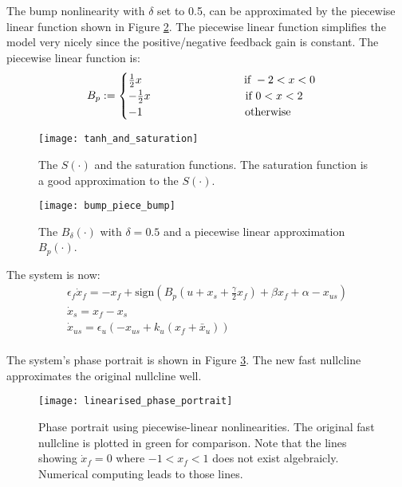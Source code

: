 \documentclass[a4paper, 12pt]{article}
\begin{document}
The bump nonlinearity with $\delta$ set to 0.5, can be approximated by the piecewise linear function shown in Figure \ref{fig:bump_linear}. The piecewise linear function simplifies the model very nicely since the positive/negative feedback gain is constant. The piecewise linear function is:
\begin{equation}
B_p:= \begin{cases}
\frac{1}{2}x \text{ \hspace{3cm}  if } -2<x<0 \\
-\frac{1}{2}x \text{\hspace{3cm}if } 0<x<2 \\
-1 \text{ \hspace{3cm}  otherwise}
\end{cases}
\end{equation}

\begin{figure}[p]
\texttt{[image: tanh\_and\_saturation]}
\caption{The $S(\cdot)$ and the saturation functions. The saturation function is a good approximation to the $S(\cdot)$. }
\label{fig:sigmoid_linear}
\end{figure}

\begin{figure}[p]
\texttt{[image: bump\_piece\_bump]}
\caption{The $B_\delta(\cdot)$ with $\delta = 0.5$ and a piecewise linear approximation $B_p(\cdot)$.}
\label{fig:bump_linear}
\end{figure}
The system is now: 
\begin{equation}
\begin{array}{l}
\displaystyle \epsilon_f\dot{x}_{f} = -x_f + \text{sign}\left(B_p\left(u + x_s + \tfrac{\gamma}{2}x_f\right) + \beta x_f + \alpha  - x_{us}  \right)\\
\displaystyle \dot{x}_{s} = x_f - x_s \\
\displaystyle \dot{x}_{us} = \epsilon_u\left(-x_{us} + k_u(x_f+\bar{x}_u) \right)\\
\end{array}
\label{eq:restSpikeBistability}
\end{equation}

The system's phase portrait is shown in Figure \ref{fig:linearised_phase_portrait}. The new fast nullcline approximates the original nullcline well. 

\begin{figure}[p]
\texttt{[image: linearised\_phase\_portrait]}
\caption{Phase portrait using piecewise-linear nonlinearities. The original fast nullcline is plotted in green for comparison. Note that the lines showing $\dot{x}_f=0$ where $-1<x_f<1$ does not exist algebraicly. Numerical computing leads to those lines.}
\label{fig:linearised_phase_portrait}
\end{figure}
\end{document}
